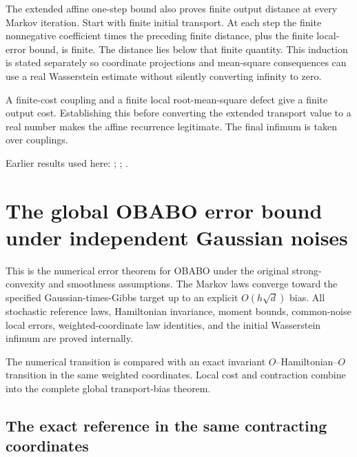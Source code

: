 \documentclass[11pt,a4paper]{report}
\begin{document}
The extended affine one-step bound also proves finite output distance at every Markov iteration. Start with finite initial transport. At each step the finite nonnegative coefficient times the preceding finite distance, plus the finite local-error bound, is finite. The distance lies below that finite quantity. This induction is stated separately so coordinate projections and mean-square consequences can use a real Wasserstein estimate without silently converting infinity to zero.



A finite-cost coupling and a finite local root-mean-square defect give a finite output cost. Establishing this before converting the extended transport value to a real number makes the affine recurrence legitimate. The final infimum is taken over couplings.



Earlier results used here: \cite[Section~3.17.3]{LangevinLean2026ULASC}; \cite[Section~3.33.11]{LangevinLean2026ULASC}; \cite[Section~3.33.6]{LangevinLean2026ULASC}.
\section{\texorpdfstring{The global OBABO error bound under independent Gaussian noises}{The global OBABO error bound under independent Gaussian noises}}
\label{proof-module-KineticLangevin-OBABOBias-lean}


This is the numerical error theorem for OBABO under the original strong-convexity and smoothness assumptions. The Markov laws converge toward the specified Gaussian-times-Gibbs target up to an explicit \(O(h\sqrt d)\) bias. All stochastic reference laws, Hamiltonian invariance, moment bounds, common-noise local errors, weighted-coordinate law identities, and the initial Wasserstein infimum are proved internally.



The numerical transition is compared with an exact invariant \(O\)–Hamiltonian–\(O\) transition in the same weighted coordinates. Local cost and contraction combine into the complete global transport-bias theorem.

\subsection{\texorpdfstring{The exact reference in the same contracting coordinates}{The exact reference in the same contracting coordinates}}
\label{report-step-KineticLangevin-OBABOBias-lean-1}
\end{document}
